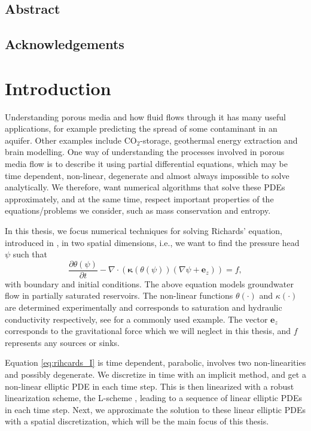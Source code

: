 \documentclass[../Main/main.tex]{subfiles}
\begin{document}
\section*{Abstract}
\markboth{}{}

\section*{Acknowledgements}

\chapter*{Introduction}
Understanding porous media and how fluid flows through it has many useful applications, for example predicting the spread of some contaminant in an aquifer. Other examples include $\text{CO}_2$-storage, geothermal energy extraction and brain modelling. One way of understanding the processes involved in porous media flow is to describe it using partial differential equations, which may be time dependent, non-linear, degenerate and almost always impossible to solve analytically. We therefore, want numerical algorithms that solve these PDEs approximately, and at the same time, respect important properties of the equations/problems we consider, such as mass conservation and entropy.\par
In this thesis, we focus numerical techniques for solving Richards' equation, introduced in \cite{doi:10.1063/1.1745010}, in two spatial dimensions, i.e., we want to find the pressure head $\psi$ such that
\begin{equation}\label{eq:rihcards_I}
	\frac{\partial \theta(\psi)}{\partial t} - \nabla \cdot (\bm{\kappa} (\theta (\psi))(\nabla \psi + \bm{e}_z)) = f,
\end{equation} 
with boundary and initial conditions. The above equation models groundwater flow in partially saturated reservoirs. The non-linear functions $\theta(\cdot)$ and $\kappa(\cdot)$ are determined experimentally and corresponds to saturation and hydraulic conductivity respectively, see \cite{article} for a commonly used example. The vector $\bm{e}_z$ corresponds to the gravitational force which we will neglect in this thesis, and $f$ represents any sources or sinks.\par
Equation \eqref{eq:rihcards_I} is time dependent, parabolic, involves two non-linearities and possibly degenerate. We discretize in time with an implicit method, and get a non-linear elliptic PDE in each time step. This is then linearized with a robust linearization scheme, the L-scheme \cite{list2016study,10.1016/j.cam.2003.04.008}, leading to a sequence of linear elliptic PDEs in each time step. Next, we approximate the solution to these linear elliptic PDEs with a spatial discretization, which will be the main focus of this thesis.
\end{document}
